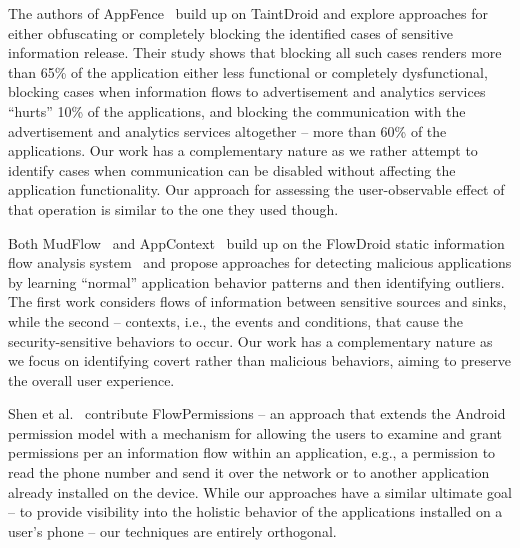 The authors of AppFence~\cite{Hornyack:Han:Jung:Schechter:Wetherall:CCS11} build up on TaintDroid and explore approaches for either obfuscating or completely blocking the identified cases of sensitive information release.
Their study shows that blocking all such cases renders more than 65\% of the application either less functional or completely dysfunctional, blocking cases when information flows to advertisement and analytics services ``hurts'' 10\% of the applications, and blocking the communication with the advertisement and analytics services altogether -- more than 60\% of the applications.
Our work has a complementary nature as we rather attempt to identify cases when communication can be disabled without affecting the application functionality. 
Our approach for assessing the user-observable effect of that operation is similar to the one they used though. 

Both MudFlow~\cite{Avdiienko:Kuznetsov:Gorla:Zeller:Arzt:Rasthofer:Bodden:ICSE15} and AppContext~\cite{Yang:Xiao:Andow:Li:Xie:Enck:ICSE15} build up on the FlowDroid static information flow analysis system~\cite{Arzt:Rasthofer:Fritz:Bodden:Bartel:Klein:Traon:Octeau:McDaniel:PLDI14} and propose approaches 
for detecting malicious applications by learning ``normal'' application behavior patterns and then identifying outliers. 
The first work considers flows of information between sensitive sources and sinks, while the second  -- contexts, i.e., the events and conditions, that cause the security-sensitive behaviors to occur. 
Our work has a complementary nature as we focus on identifying covert rather than malicious behaviors, aiming to preserve the overall user experience. 

Shen et al.~\cite{Shen:Vishnubhotla:Todarka:Arora:Dhandapani:Lehner:Ko:Ziarek:ASE14} contribute FlowPermissions -- 
an approach that extends the Android permission model with a mechanism for allowing the users to examine and grant permissions per an information flow within an application, e.g., a permission to read
the phone number and send it over the network or to another application already installed on the device. 
While our approaches have a similar ultimate goal -- to provide visibility into the holistic behavior of the applications installed on a user's phone -- our techniques are entirely orthogonal. 


